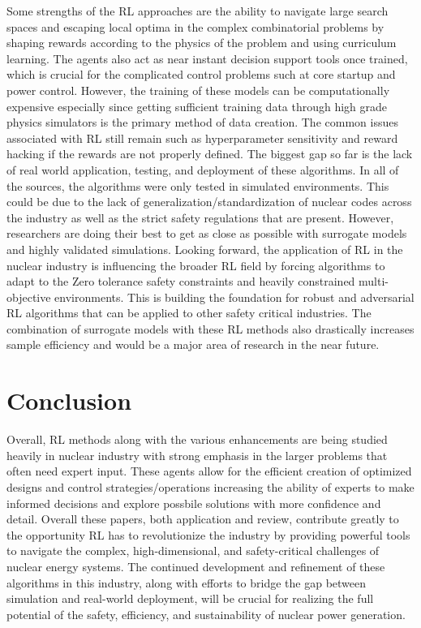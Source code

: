 \documentclass{article}
\begin{document}
\newline
Some strengths of the RL approaches are the ability to navigate large search spaces and escaping local optima in the complex combinatorial problems by shaping rewards according to the physics of the problem and using curriculum learning. The agents also act as near instant decision support tools once trained, which is crucial for the complicated control problems such at core startup and power control. However, the training of these models can be computationally expensive especially since getting sufficient training data through high grade physics simulators is the primary method of data creation. The common issues associated with RL still remain such as hyperparameter sensitivity and reward hacking if the rewards are not properly defined.
\newline
The biggest gap so far is the lack of real world application, testing, and deployment of these algorithms. In all of the sources, the algorithms were only tested in simulated environments. This could be due to the lack of generalization/standardization of nuclear codes across the industry as well as the strict safety regulations that are present. However, researchers are doing their best to get as close as possible with surrogate models and highly validated simulations.
\newline
Looking forward, the application of RL in the nuclear industry is influencing the broader RL field by forcing algorithms to adapt to the Zero tolerance safety constraints and heavily constrained multi-objective environments. This is building the foundation for robust and adversarial RL algorithms that can be applied to other safety critical industries. The combination of surrogate models with these RL methods also drastically increases sample efficiency and would be a major area of research in the near future.
\section{Conclusion}
Overall, RL methods along with the various enhancements are being studied heavily in nuclear industry with strong emphasis in the larger problems that often need expert input. These agents allow for the efficient creation of optimized designs and control strategies/operations increasing the ability of experts to make informed decisions and explore possbile solutions with more confidence and detail. Overall these papers, both application and review, contribute greatly to the opportunity RL has to revolutionize the industry by providing powerful tools to navigate the complex, high-dimensional, and safety-critical challenges of nuclear energy systems. The continued development and refinement of these algorithms in this industry, along with efforts to bridge the gap between simulation and real-world deployment, will be crucial for realizing the full potential of the safety, efficiency, and sustainability of nuclear power generation.
\end{document}
